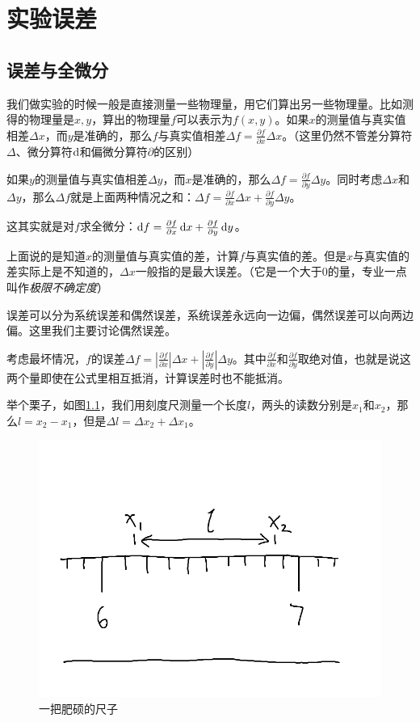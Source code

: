\chapter{实验误差}
\section{误差与全微分}
我们做实验的时候一般是直接测量一些物理量，用它们算出另一些物理量。比如测得的物理量是$x,y$，算出的物理量$f$可以表示为$f(x,y)$。如果$x$的测量值与真实值相差$\Delta x$，而$y$是准确的，那么$f$与真实值相差$\Delta f=\frac{\partial f}{\partial x} \Delta x$。（这里仍然不管差分算符$\Delta$、微分算符$\mathop{}\!\mathrm{d}$和偏微分算符$\partial$的区别）

如果$y$的测量值与真实值相差$\Delta y$，而$x$是准确的，那么$\Delta f=\frac{\partial f}{\partial y} \Delta y$。同时考虑$\Delta x$和$\Delta y$，那么$\Delta f$就是上面两种情况之和：$\Delta f=\frac{\partial f}{\partial x} \Delta x+\frac{\partial f}{\partial y} \Delta y$。

这其实就是对$f$求全微分：$\mathop{}\!\mathrm{d} f=\frac{\partial f}{\partial x} \mathop{}\!\mathrm{d} x+\frac{\partial f}{\partial y} \mathop{}\!\mathrm{d} y$。

上面说的是知道$x$的测量值与真实值的差，计算$f$与真实值的差。但是$x$与真实值的差实际上是不知道的，$\Delta x$一般指的是最大误差。（它是一个大于$0$的量，专业一点叫作\emph{极限不确定度}）

误差可以分为系统误差和偶然误差，系统误差永远向一边偏，偶然误差可以向两边偏。这里我们主要讨论偶然误差。

考虑最坏情况，$f$的误差$\Delta f=|\frac{\partial f}{\partial x}| \Delta x+|\frac{\partial f}{\partial y}| \Delta y$。其中$\frac{\partial f}{\partial x}$和$\frac{\partial f}{\partial y}$取绝对值，也就是说这两个量即使在公式里相互抵消，计算误差时也不能抵消。

举个栗子，如图\ref{fig-length-diff}，我们用刻度尺测量一个长度$l$，两头的读数分别是$x_1$和$x_2$，那么$l=x_2-x_1$，但是$\Delta l=\Delta x_2+\Delta x_1$。
\begin{figure}[htb]
\centering
\includegraphics[scale=0.5]{fig/length-diff}
\caption{一把肥硕的尺子}
\label{fig-length-diff}
\end{figure}

